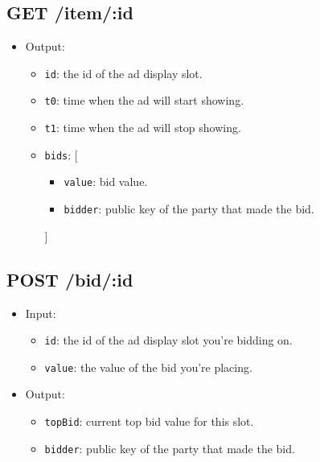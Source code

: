 \documentclass{article}
\begin{document}
\subsection{GET /item/:id}
\begin{itemize}

    \item { Output:
        \begin{itemize}

            \item \texttt{id}: the id of the ad display slot.
            \item \texttt{t0}: time when the ad will start showing.
            \item \texttt{t1}: time when the ad will stop showing.
            \item { \texttt{bids}: [

                \begin{itemize}
                    \item \texttt{value}: bid value.
                    \item \texttt{bidder}: public key of the party that made the bid.
                \end{itemize}

            ] }

        \end{itemize}
    }
\end{itemize}
\subsection{POST /bid/:id}
\begin{itemize}
    \item {Input:
        \begin{itemize}

            \item \texttt{id}: the id of the ad display slot you're bidding on.
            \item \texttt{value}: the value of the bid you're placing.

        \end{itemize}
    }
    \item {Output:
        \begin{itemize}

            \item \texttt{topBid}: current top bid value for this slot.
            \item \texttt{bidder}: public key of the party that made the bid.

        \end{itemize}
    }
\end{itemize}
\end{document}
